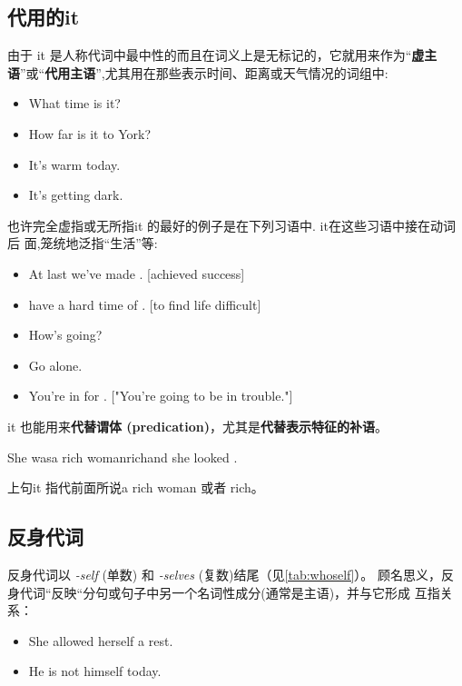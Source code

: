 \subsection{代用的it}

由于 it 是人称代词中最中性的而且在词义上是无标记的，它就用来作为“\textbf{虚主
  语}”或“\textbf{代用主语}”,尤其用在那些表示时间、距离或天气情况的词组中:
\begin{itemize}
\item What time is it?
\item How far is it to York?
\item It's warm today.
\item It's getting dark.
\end{itemize}

也许完全虚指或无所指it 的最好的例子是在下列习语中. it在这些习语中接在动词后
面,笼统地泛指“生活”等:
\begin{itemize}
\item At last we've made . [achieved success]
\item have a hard time of . [to find life difficult]
\item How's  going?
\item Go  alone.
\item You're in for . ["You're going to be in trouble."]
\end{itemize}

it 也能用来\textbf{代替谓体 (predication)}，尤其是\textbf{代替表示特征的补语}。
\begin{sdbig4}{She was}{a rich woman}{rich}{and she looked .}
\end{sdbig4}

上句it 指代前面所说a rich woman 或者 rich。

\subsection{反身代词}
反身代词以 \emph{-self} (单数) 和 \emph{-selves} (复数)结尾（见\cref{tab:whoself}）。
顾名思义，反身代词“反映“分句或句子中另一个名词性成分(通常是主语)，并与它形成
互指关系：
\begin{itemize}
\item She allowed herself a rest.
\item He is not himself today.
\end{itemize}


